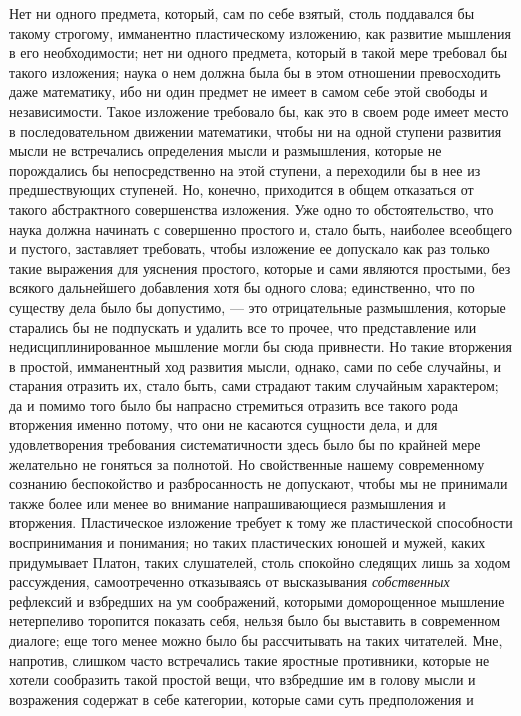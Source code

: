 Нет ни одного предмета, который, сам по себе взятый, столь поддавался бы
такому строгому, имманентно пластическому изложению, как развитие мышления
в его необходимости; нет ни одного предмета, который в такой мере требовал
бы такого изложения; наука о нем должна была бы в этом отношении
превосходить даже математику, ибо ни один предмет не имеет в самом себе
этой свободы и независимости. Такое изложение требовало бы, как это в своем
роде имеет место в последовательном движении математики, чтобы ни на одной
ступени развития мысли не встречались определения мысли и размышления,
которые не порождались бы непосредственно на этой ступени, а переходили бы
в нее из предшествующих ступеней. Но, конечно, приходится в общем
отказаться от такого абстрактного совершенства изложения. Уже одно то
обстоятельство, что наука должна начинать с совершенно простого и, стало
быть, наиболее всеобщего и пустого, заставляет требовать, чтобы изложение
ее допускало как раз только такие выражения для уяснения простого, которые
и сами являются простыми, без всякого дальнейшего добавления хотя бы одного
слова; единственно, что по существу дела было бы допустимо, — это
отрицательные размышления, которые старались бы не подпускать и удалить все
то прочее, что представление или недисциплинированное мышление могли бы
сюда привнести. Но такие вторжения в простой, имманентный ход развития
мысли, однако, сами по себе случайны, и старания отразить их, стало быть,
сами страдают таким случайным характером; да и помимо того было бы напрасно
стремиться отразить все такого рода вторжения именно потому, что они не
касаются сущности дела, и для удовлетворения требования систематичности
здесь было бы по крайней мере желательно не гоняться за полнотой. Но
свойственные нашему современному сознанию беспокойство и разбросанность не
допускают, чтобы мы не принимали также более или менее во внимание
напрашивающиеся размышления и вторжения. Пластическое изложение требует к
тому же пластической способности воспринимания и понимания; но таких
пластических юношей и мужей, каких придумывает Платон, таких слушателей,
столь спокойно следящих лишь за ходом рассуждения, самоотреченно
отказываясь от высказывания {\em собственных} рефлексий
и взбредших на ум соображений, которыми доморощенное мышление нетерпеливо
торопится показать себя, нельзя было бы выставить в современном диалоге;
еще того менее можно было бы рассчитывать на таких читателей. Мне,
напротив, слишком часто встречались такие яростные противники, которые не
хотели сообразить такой простой вещи, что взбредшие им в голову мысли и
возражения содержат в себе категории, которые сами суть предположения и
